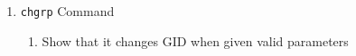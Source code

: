 \documentclass[11pt,letterpaper]{report}
\begin{document}
\begin{enumerate}
                                                                                                                                                                                                                                                                                                                                                                                                                                                                                                                                                                                                                                                                                        \newpage

                                                                                                                                                                                                                                                                                                                                                                                                                                                                                                                                                                                                                                                                                            \item {\tt chgrp} Command
                                                                                                                                                                                                                                                                                                                                                                                                                                                                                                                                                                                                                                                                                                \begin{enumerate}
                                                                                                                                                                                                                                                                                                                                                                                                                                                                                                                                                                                                                                                                                                        \item Show that it changes GID when given valid parameters

\end{enumerate}
\end{enumerate}
\end{document}
